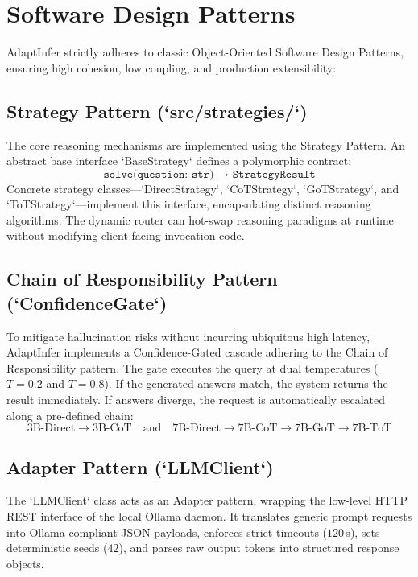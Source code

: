 \documentclass[12pt,a4paper]{report}
\begin{document}
\section{Software Design Patterns}
\label{sec:design_patterns}
AdaptInfer strictly adheres to classic Object-Oriented Software Design Patterns, ensuring high cohesion, low coupling, and production extensibility:

\subsection{Strategy Pattern (`src/strategies/`)}
The core reasoning mechanisms are implemented using the Strategy Pattern. An abstract base interface `BaseStrategy` defines a polymorphic contract:
\begin{equation}
\texttt{solve(question: str) } \longrightarrow \texttt{ StrategyResult}
\end{equation}
Concrete strategy classes—`DirectStrategy`, `CoTStrategy`, `GoTStrategy`, and `ToTStrategy`—implement this interface, encapsulating distinct reasoning algorithms. The dynamic router can hot-swap reasoning paradigms at runtime without modifying client-facing invocation code.

\subsection{Chain of Responsibility Pattern (`ConfidenceGate`)}
To mitigate hallucination risks without incurring ubiquitous high latency, AdaptInfer implements a Confidence-Gated cascade adhering to the Chain of Responsibility pattern. The gate executes the query at dual temperatures ($T=0.2$ and $T=0.8$). If the generated answers match, the system returns the result immediately. If answers diverge, the request is automatically escalated along a pre-defined chain:
\begin{equation}
\text{3B-Direct} \longrightarrow \text{3B-CoT} \quad \text{and} \quad \text{7B-Direct} \longrightarrow \text{7B-CoT} \longrightarrow \text{7B-GoT} \longrightarrow \text{7B-ToT}
\end{equation}

\subsection{Adapter Pattern (`LLMClient`)}
The `LLMClient` class acts as an Adapter pattern, wrapping the low-level HTTP REST interface of the local Ollama daemon. It translates generic prompt requests into Ollama-compliant JSON payloads, enforces strict timeouts ($120$\,s), sets deterministic seeds ($42$), and parses raw output tokens into structured response objects.
\end{document}
